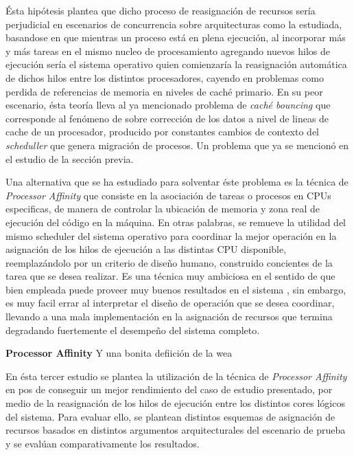 Ésta hipótesis plantea que dicho proceso de reasignación de recursos sería perjudicial en escenarios de concurrencia sobre arquitecturas como la estudiada, basandose en que mientras un proceso está en plena ejecución, al incorporar más y más tareas en el mismo nucleo de procesamiento agregando nuevos hilos de ejecución sería el sistema operativo quien comienzaría la reasignación automática de dichos hilos entre los distintos procesadores, cayendo en problemas como perdida de referencias de memoria en niveles de caché primario. En su peor escenario, ésta teoría lleva al ya mencionado problema de \emph{caché bouncing} \cite{paper:cachebouncing} que corresponde al fenómeno de sobre corrección de los datos a nivel de lineas de cache de un procesador, producido por constantes cambios de contexto del \emph{scheduller} que genera migración de procesos. Un problema que ya se mencionó en el estudio de la sección previa.

Una alternativa que se ha estudiado para solventar éste problema es la técnica de \emph{Processor Affinity} que consiste en la asociación de tareas o procesos en CPUs especificas, de manera de controlar la ubicación de memoria y zona real de ejecución del código en la máquina. En otras palabras, se remueve la utilidad del mismo scheduler del sistema operativo para coordinar la mejor operación en la asignación de los hilos de ejecución a las distintas CPU disponible, reemplazándolo por un criterio de diseño humano, construido concientes de la tarea que se desea realizar. Es una técnica muy ambiciosa en el sentido de que bien empleada puede proveer muy buenos resultados en el sistema \cite{paper:cacheaffinity}, sin embargo, es muy facil errar al interpretar el diseño de operación que se desea coordinar, llevando a una mala implementación en la asignación de recursos que termina degradando fuertemente el desempeño del sistema completo.

\begin{defn} \textbf{Processor Affinity} Y una bonita defiición de la wea
\end{defn}

En ésta tercer estudio se plantea la utilización de la técnica de \emph{Processor Affinity} en pos de conseguir un mejor rendimiento del caso de estudio presentado, por medio de la reasignación de los hilos de ejecución entre los distintos cores lógicos del sistema. Para evaluar ello, se plantean distintos esquemas de asignación de recursos basados en distintos argumentos arquitecturales del escenario de prueba y se evalúan comparativamente los resultados.


